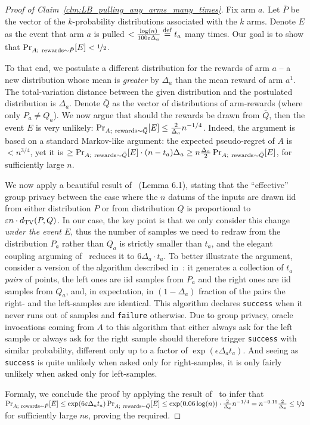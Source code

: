 \documentclass{article}
\begin{document}
\begin{proof}[Proof of Claim~\ref{clm:LB_pulling_any_arms_many_times}]
Fix arm $a$. Let $\bar P$ be the vector of the $k$-probability distributions associated with the $k$ arms. Denote $E$ as the event that arm $a$ is pulled $<\tfrac{\log(n)}{100\varepsilon\Delta_a} \stackrel{\rm def}= t_a$ many times. Our goal is to show that $\Pr_{A;~{\rm rewards}\sim \bar P}[E]<\nicefrac 1 2$.

To that end, we postulate a different distribution for the rewards of arm $a$ -- a new distribution whose mean is \emph{greater} by $\Delta_a$ than the mean reward of arm $a^1$. The total-variation distance between the given distribution and the postulated distribution is $\Delta_a$. Denote $\bar Q$ as the vector of distributions of arm-rewards (where only $P_a \neq Q_a$). We now argue that should the rewards be drawn from $\bar Q$, then the event $E$ is  very unlikely: $\Pr_{A;~{\rm rewards}\sim \bar Q}[E] \leq \tfrac 2{\Delta_a}n^{-1/4}$. Indeed, the argument is based on a standard Markov-like argument: the expected pseudo-regret of $A$ is $<n^{3/4}$, yet it is $\geq \Pr_{A;~{\rm rewards}\sim \bar Q}[E]\cdot (n-t_a) \Delta_a \geq n\tfrac{\Delta_a}2\Pr_{A;~{\rm rewards}\sim \bar Q}[E]$, for sufficiently large $n$.


We now apply a beautiful result of~\cite{KarwaVadhanFiniteSampleDP2017} (Lemma 6.1), stating that the ``effective'' group privacy between the case where the $n$ datums of the inputs are drawn iid from either distribution $P$ or from distribution $Q$ is proportional to $\varepsilon n\cdot d_{\rm TV}(P,Q)$. In our case, the key point is that we only consider this change \emph{under the event $E$}, thus the number of samples we need to redraw from the distribution $P_a$ rather than $Q_a$ is strictly smaller than $t_a$, and the elegant coupling arguming of~\cite{KarwaVadhanFiniteSampleDP2017} reduces it to $6\Delta_a \cdot t_a$. To better illustrate the argument, consider a version of the algorithm described in~\cite{KarwaVadhanFiniteSampleDP2017}: it generates a collection of $t_a$ \emph{pairs} of points, the left ones are iid samples from $P_a$ and the right ones are iid samples from $Q_a$, and, in expectation, in $(1-\Delta_a)$ fraction of the pairs the right- and the left-samples are identical. This algorithm declares {\tt success} when it never runs out of samples and {\tt failure} otherwise. Due to group privacy, oracle invocations coming from $A$ to this algorithm that either always ask for the left sample or always ask for the right sample should therefore trigger {\tt success} with similar probability, different only up to a factor of $\exp(\epsilon \Delta_a t_a)$. And seeing as {\tt success} is quite unlikely when asked only for right-samples, it is only fairly unlikely when asked only for left-samples.

Formaly, we conclude the proof by applying the result of~\cite{KarwaVadhanFiniteSampleDP2017} to infer that $\Pr_{A;~{\rm rewards}\sim \bar P}[E] \leq \exp(6\varepsilon\Delta_a t_a)\Pr_{A;~{\rm rewards}\sim \bar Q}[E] \leq \exp(0.06 \log(n)) \cdot \tfrac 2{\Delta_a}n^{-1/4} = n^{-0.19}\tfrac 2{\Delta_a} \leq \nicefrac 1 2$ for sufficiently large $n$s, proving the required.
\end{proof}
\end{document}
